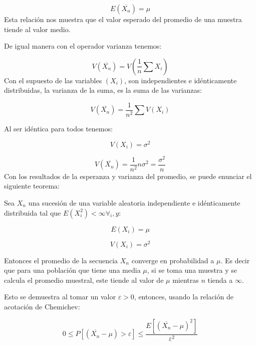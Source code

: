 \documentclass{rbf}
\begin{document}
\begin{equation}
  \displaystyle  E(\overline{X_n})=\mu
\end{equation}
Esta relación nos muestra que el valor esperado del promedio de una muestra tiende al valor medio.

De igual manera con el operador varianza tenemos:

\begin{equation}
  \displaystyle   V(\overline{X_n})=V(\frac{1}{n} \sum X_i)
\end{equation}
Con el supuesto de las variables $(X_i )$, son independientes e idénticamente distribuidas, la varianza de la suma, es la suma de las varianzas:

\begin{equation}
  \displaystyle  V(\overline{X_n})=\frac{1}{n^2} \sum V(X_i)
\end{equation}

Al ser idéntica para todos tenemos:

\begin{equation}
 \displaystyle   V({X_i})=\sigma^2
\end{equation}

\begin{equation}
   \displaystyle  V(\overline{X_n})=\frac{1}{n^2} n\sigma^2 =\frac{\sigma^2}{n}
\end{equation}
Con los resultados de la esperanza y varianza del promedio, se puede enunciar el siguiente teorema: 

Sea $X_n$ una sucesión de una variable aleatoria independiente e idénticamente distribuida tal que $E(X_i^2 )<\infty  \forall_i ,y:$

\begin{equation}
  \displaystyle   E({X_i})=\mu
\end{equation}

\begin{equation}
 \displaystyle    V({X_i})=\sigma^2
\end{equation}

Entonces el promedio de la secuencia $X_n$ converge en probabilidad a $\mu$. Es decir que para una población que tiene una media $\mu$, si se toma una muestra y se calcula el promedio muestral, este tiende al valor de $\mu$ mientras $n$ tienda a $\infty$. 

Esto se demuestra al tomar un valor $\varepsilon> 0$, entonces, usando la relación de acotación de Chemichev:

\begin{equation}
  \displaystyle   0\leq P[(\overline{X_n}-\mu)>\varepsilon] \leq \frac{E[(\overline{X_n}-\mu)^2]}{\varepsilon^2}
\end{equation}
\end{document}
